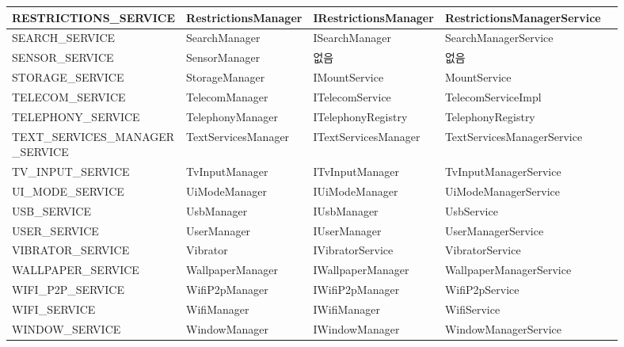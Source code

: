 {\begin{tabular}[fontsize=\tiny]{|l|l|l|l|l|}
RESTRICTIONS\_SERVICE & RestrictionsManager &  IRestrictionsManager  & RestrictionsManagerService \\ \hline
SEARCH\_SERVICE & SearchManager & ISearchManager & SearchManagerService \\ \hline
SENSOR\_SERVICE & SensorManager & 없음 & 없음 \\ \hline
STORAGE\_SERVICE	& StorageManager & IMountService & MountService\\ \hline
TELECOM\_SERVICE	& TelecomManager &  ITelecomService &  TelecomServiceImpl\\ \hline
TELEPHONY\_SERVICE & TelephonyManager & ITelephonyRegistry & TelephonyRegistry \\ \hline
\makecell[l]{TEXT\_SERVICES\_MANAGER\\ \_SERVICE} & TextServicesManager & ITextServicesManager & TextServicesManagerService \\ \hline
TV\_INPUT\_SERVICE	 & TvInputManager &  ITvInputManager & TvInputManagerService \\ \hline
UI\_MODE\_SERVICE	& UiModeManager & IUiModeManager & UiModeManagerService \\ \hline
USB\_SERVICE	 & UsbManager & IUsbManager & UsbService \\ \hline
USER\_SERVICE	 & UserManager & IUserManager & UserManagerService \\ \hline
VIBRATOR\_SERVICE & Vibrator & IVibratorService & VibratorService \\ \hline
WALLPAPER\_SERVICE & WallpaperManager & IWallpaperManager & WallpaperManagerService \\ \hline
WIFI\_P2P\_SERVICE	 & WifiP2pManager & IWifiP2pManager & WifiP2pService \\ \hline
WIFI\_SERVICE & WifiManager & IWifiManager & WifiService \\ \hline
WINDOW\_SERVICE & WindowManager & IWindowManager & WindowManagerService \\ \hline
\end{tabular}
}

